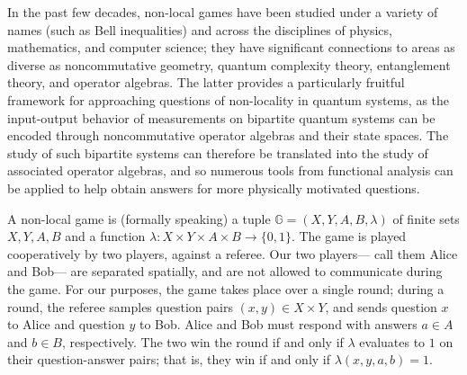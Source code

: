 \documentclass[11pt]{amsart}
\begin{document}
In the past few decades, non-local games have been studied under a variety of names (such as Bell inequalities) and across the disciplines of physics, mathematics, and computer science; they have significant connections to areas as diverse as noncommutative geometry, quantum complexity theory, entanglement theory, and operator algebras. The latter provides a particularly fruitful framework for approaching questions of non-locality in quantum systems, as the input-output behavior of measurements on bipartite quantum systems can be encoded through noncommutative operator algebras and their state spaces. The study of such bipartite systems can therefore be translated into the study of associated operator algebras, and so numerous tools from functional analysis can be applied to help obtain answers for more physically motivated questions. 

A non-local game is (formally speaking) a tuple $\mathbb{G} = (X, Y, A, B, \lambda)$ of finite sets $X, Y, A, B$ and a function $\lambda: X\times Y\times A\times B\rightarrow \{0, 1\}$. The game is played cooperatively by two players, against a referee. Our two players--- call them Alice and Bob--- are separated spatially, and are not allowed to communicate during the game. For our purposes, the game takes place over a single round; during a round, the referee samples question pairs $(x, y) \in X\times Y$, and sends question $x$ to Alice and question $y$ to Bob. Alice and Bob must respond with answers $a \in A$ and $b \in B$, respectively. The two win the round if and only if $\lambda$ evaluates to $1$ on their question-answer pairs; that is, they win if and only if $\lambda(x, y, a, b) = 1$. 
\end{document}
